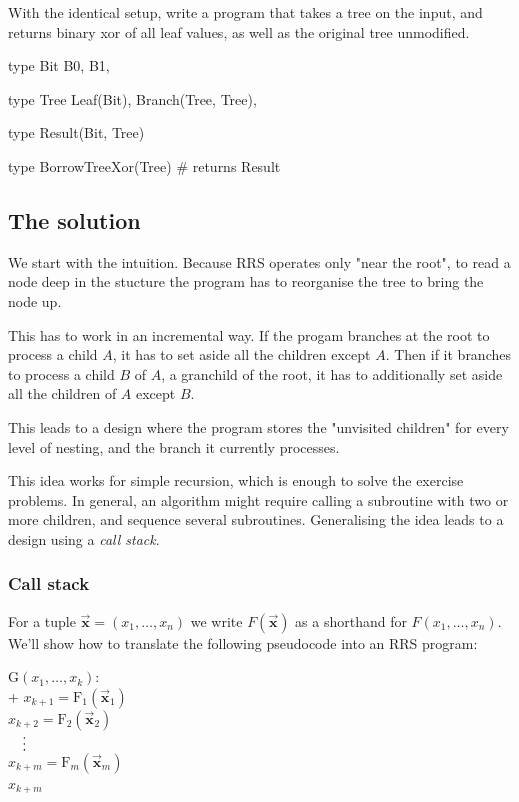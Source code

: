 \documentclass[11pt]{article}
\begin{document}
\begin{exercise}[BorrowTreeXor]

With the identical setup, write a program that takes a tree on the input, and
returns binary xor of all leaf values, as well as the original tree unmodified.

\begin{rrscode}
type Bit {
  B0,
  B1,
}

type Tree {
  Leaf(Bit),
  Branch(Tree, Tree),
}

type Result(Bit, Tree)

type BorrowTreeXor(Tree)  # returns Result
\end{rrscode}

\end{exercise}


\subsection{The solution}

We start with the intuition. Because RRS operates only "near the root",
to read a node deep in the stucture the program has to reorganise the tree
to bring the node up.

This has to work in an incremental way. If the progam branches at the root
to process a child $A$, it has to set aside all the children except $A$. Then
if it branches to process a child $B$ of $A$, a granchild of the root,
it has to additionally set aside all the children of $A$ except $B$.

This leads to a design where the program stores the "unvisited children" for
every level of nesting, and the branch it currently processes.

This idea works for simple recursion, which is enough to solve the exercise
problems. In general, an algorithm might require calling a subroutine with
two or more children, and sequence several subroutines. Generalising
the idea leads to a design using a \emph{call stack}.

\subsubsection{Call stack}

For a tuple $\vec{\bm{x}} = (x_1, \dots, x_n)$ we write $F(\vec{\bm{x}})$
as a shorthand for $F(x_1, \dots, x_n)$. We'll show how to translate the
following pseudocode into an RRS program:

\begin{pseudo}
   $\mathrm{G}(x_1, \dots, x_k)$: \\+
    $x_{k+1} = \mathrm{F}_1(\vec{\bm{x}}_1)$ \\
    $x_{k+2} = \mathrm{F}_2(\vec{\bm{x}}_2)$ \\
    $\quad\pvdots$ \\
    $x_{k+m} = \mathrm{F}_m(\vec{\bm{x}}_m)$ \\
     $x_{k+m}$
\end{pseudo}
\end{document}
